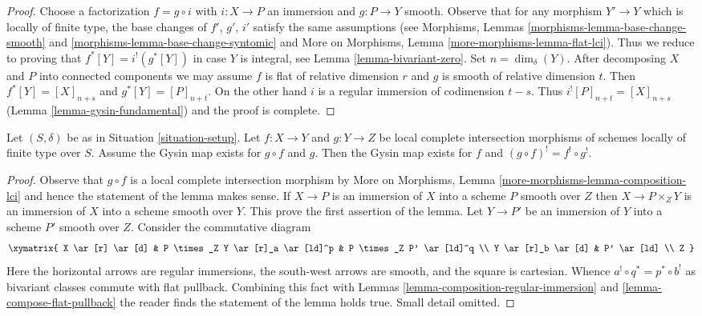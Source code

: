 \begin{proof}
Choose a factorization $f = g \circ i$ with $i : X \to P$
an immersion and $g : P \to Y$ smooth. Observe that for
any morphism $Y' \to Y$ which is locally of finite type,
the base changes of $f'$, $g'$, $i'$ satisfy the same
assumptions (see Morphisms, Lemmas \ref{morphisms-lemma-base-change-smooth}
and \ref{morphisms-lemma-base-change-syntomic} and
More on Morphisms, Lemma \ref{more-morphisms-lemma-flat-lci}).
Thus we reduce to proving that $f^*[Y] = i^!(g^*[Y])$ in case $Y$
is integral, see Lemma \ref{lemma-bivariant-zero}. Set $n = \dim_\delta(Y)$.
After decomposing $X$ and $P$ into connected components we
may assume $f$ is flat of relative dimension $r$ and
$g$ is smooth of relative dimension $t$.
Then $f^*[Y] = [X]_{n + s}$ and $g^*[Y] = [P]_{n + t}$.
On the other hand $i$ is a regular immersion of codimension $t - s$.
Thus $i^![P]_{n + t} = [X]_{n + s}$ (Lemma \ref{lemma-gysin-fundamental})
and the proof is complete.
\end{proof}

\begin{lemma}
\label{lemma-lci-gysin-composition}
Let $(S, \delta)$ be as in Situation \ref{situation-setup}.
Let $f : X \to Y$ and $g : Y \to Z$ be local complete intersection morphisms
of schemes locally of finite type over $S$. Assume the Gysin
map exists for $g \circ f$ and $g$. Then the Gysin map exists for $f$
and $(g \circ f)^! = f^! \circ g^!$.
\end{lemma}

\begin{proof}
Observe that $g \circ f$ is a local complete intersection morphism
by More on Morphisms, Lemma \ref{more-morphisms-lemma-composition-lci}
and hence the statement of the lemma makes sense.
If $X \to P$ is an immersion of $X$ into a scheme $P$ smooth over $Z$
then $X \to P \times_Z Y$ is an immersion of $X$ into a scheme smooth
over $Y$. This prove the first assertion of the lemma.
Let $Y \to P'$ be an immersion of $Y$ into a scheme $P'$ smooth over $Z$.
Consider the commutative diagram
$$
\xymatrix{
X \ar[r] \ar[d] &
P \times_Z Y \ar[r]_a \ar[ld]^p &
P \times_Z P' \ar[ld]^q \\
Y \ar[r]_b \ar[d] &
P' \ar[ld] \\
Z
}
$$
Here the horizontal arrows are regular immersions, the south-west arrows
are smooth, and the square is cartesian. Whence
$a^! \circ q^* = p^* \circ b^!$ as bivariant classes commute
with flat pullback. Combining this fact with
Lemmas \ref{lemma-composition-regular-immersion} and
\ref{lemma-compose-flat-pullback}
the reader finds the statement of the lemma holds true.
Small detail omitted.
\end{proof}

